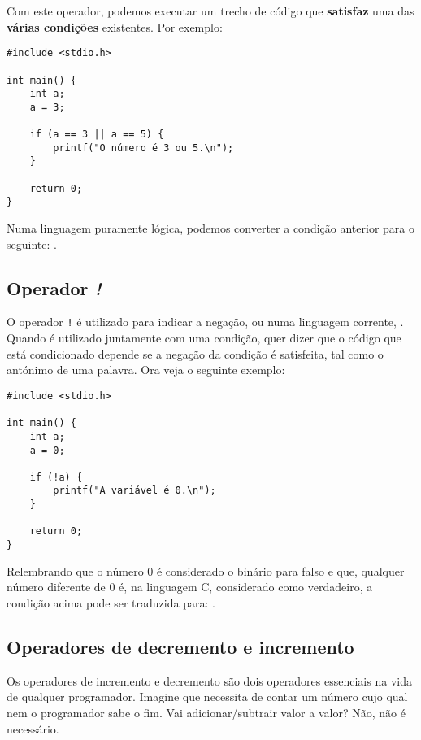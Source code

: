 Com este operador, podemos executar um trecho de código que \textbf{satisfaz} uma das \textbf{várias condições} existentes. Por exemplo:

\begin{lstlisting}
#include <stdio.h>  
   
int main() {     
    int a;  
    a = 3;  
   
    if (a == 3 || a == 5) {  
        printf("O número é 3 ou 5.\n");  
    }  
	   
    return 0;  
}  
\end{lstlisting}

Numa linguagem puramente lógica, podemos converter a condição anterior para o seguinte: .

\subsection{Operador \textit{!}}

O operador \texttt{!} é utilizado para indicar a negação, ou numa linguagem corrente, . Quando é utilizado juntamente com uma condição, quer dizer que o código que está condicionado depende se a negação da condição é satisfeita, tal como o antónimo de uma palavra. Ora veja o seguinte exemplo:

\begin{lstlisting}
#include <stdio.h>  
   
int main() {     
    int a;  
    a = 0;  
   
    if (!a) {  
        printf("A variável é 0.\n");  
    }  
   
    return 0;  
}  
\end{lstlisting}

Relembrando que o número 0 é considerado o binário para falso e que, qualquer número diferente de 0 é, na linguagem C, considerado como verdadeiro, a condição acima pode ser traduzida para: .

\subsection{Operadores de decremento e incremento}

Os operadores de incremento e decremento são dois operadores essenciais na vida de qualquer programador. Imagine que necessita de contar um número cujo qual nem o programador sabe o fim. Vai adicionar/subtrair valor a valor? Não, não é necessário.

